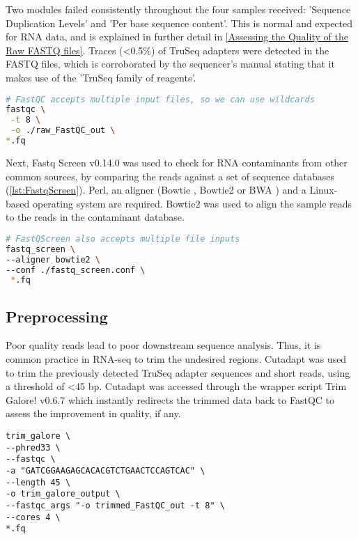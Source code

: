 Two modules failed consistently throughout the four samples received: 'Sequence Duplication Levels' and 'Per base sequence content'. This is normal and expected for RNA data, and is explained in further detail in \autoref{Assessing the Quality of the Raw FASTQ files}. Traces (<0.5\%) of TruSeq adapters were detected in the FASTQ files, which is corroborated by the sequencer's manual \citep{HiSeq2000} stating that it makes use of the 'TruSeq family of reagents'. 

\begin{lstlisting}[language=bash, caption=FastQC command, label={lst:FastQC}]
# FastQC accepts multiple input files, so we can use wildcards
fastqc \
 -t 8 \
 -o ./raw_FastQC_out \
*.fq 
\end{lstlisting}

Next, Fastq Screen v0.14.0 \citep{wingett2018fastq} was used to check for RNA contaminants from other common sources, by comparing the reads against a set of sequence databases (\autoref{lst:FastqScreen}). Perl, an aligner (Bowtie \citep{bowtie}, Bowtie2 \citep{bowtie2} or BWA \citep{bwa}) and a Linux-based operating system are required. Bowtie2 was used to align the sample reads to the reads in the contaminant database.

\begin{lstlisting}[language=bash, caption=FastqScreen command, label={lst:FastqScreen}]
# FastQScreen also accepts multiple file inputs
fastq_screen \
--aligner bowtie2 \
--conf ./fastq_screen.conf \
 *.fq 
\end{lstlisting}

\subsection{Preprocessing}
Poor quality reads lead to poor downstream sequence analysis. Thus, it is common practice in RNA-seq to trim the undesired regions. Cutadapt \citep{martin2011cutadapt} was used to trim the previously detected TruSeq adapter sequences and short reads, using a threshold of <45 bp. Cutadapt was accessed through the wrapper script Trim Galore! v0.6.7 \citep{trimgalore} which instantly redirects the trimmed data back to FastQC to assess the improvement in quality, if any.

\begin{lstlisting}[caption=Trim Galore! trimming]
trim_galore \
--phred33 \
--fastqc \
-a "GATCGGAAGAGCACACGTCTGAACTCCAGTCAC" \
--length 45 \
-o trim_galore_output \
--fastqc_args "-o trimmed_FastQC_out -t 8" \
--cores 4 \
*.fq 
\end{lstlisting}

